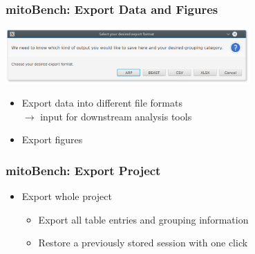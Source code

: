 \documentclass{beamer} %
\begin{document}
%


\begin{frame}
\frametitle{mitoBench: Export Data and Figures}
\begin{center}
	\includegraphics[width=0.7\textwidth]{imagesBench/exportData.png}
\end{center}

\begin{itemize}
	\item Export data into different file formats \\ 
    $\rightarrow$ input for downstream analysis tools
    \item Export figures 
\end{itemize}
\end{frame}


\begin{frame}
\frametitle{mitoBench: Export Project}
\begin{itemize}
\item Export whole project
	\begin{itemize}
		\item Export all table entries and grouping information \pause
        \item Restore a previously stored session with one click
	\end{itemize}
\end{itemize}
\end{frame}


%
%
\end{document}
